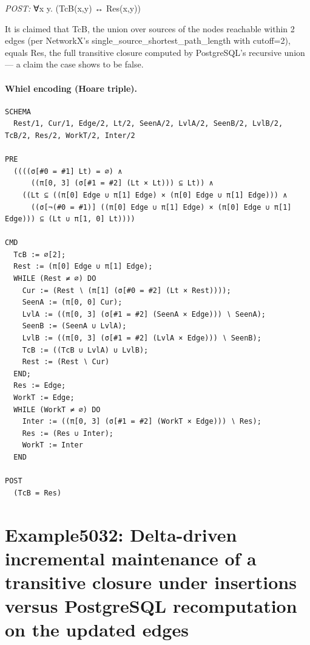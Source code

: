 \documentclass[10pt]{article}
\begin{document}
\textit{POST:} ∀x y. (TcB(x,y) ↔ Res(x,y))\par It is claimed that TcB, the union over sources of the nodes reachable within 2 edges (per NetworkX's single\_source\_shortest\_path\_length with cutoff=2), equals Res, the full transitive closure computed by PostgreSQL's recursive union --- a claim the case shows to be false.

\paragraph{Whiel encoding (Hoare triple).}

\begin{Verbatim}[fontsize=\scriptsize,breaklines=true,breakanywhere=true,frame=single,framesep=1.5mm]
SCHEMA
  Rest/1, Cur/1, Edge/2, Lt/2, SeenA/2, LvlA/2, SeenB/2, LvlB/2, TcB/2, Res/2, WorkT/2, Inter/2

PRE
  ((((σ[#0 = #1] Lt) = ∅) ∧
      ((π[0, 3] (σ[#1 = #2] (Lt × Lt))) ⊆ Lt)) ∧
    ((Lt ⊆ ((π[0] Edge ∪ π[1] Edge) × (π[0] Edge ∪ π[1] Edge))) ∧
      ((σ[¬(#0 = #1)] ((π[0] Edge ∪ π[1] Edge) × (π[0] Edge ∪ π[1] Edge))) ⊆ (Lt ∪ π[1, 0] Lt))))

CMD
  TcB := ∅[2];
  Rest := (π[0] Edge ∪ π[1] Edge);
  WHILE (Rest ≠ ∅) DO
    Cur := (Rest ∖ (π[1] (σ[#0 = #2] (Lt × Rest))));
    SeenA := (π[0, 0] Cur);
    LvlA := ((π[0, 3] (σ[#1 = #2] (SeenA × Edge))) ∖ SeenA);
    SeenB := (SeenA ∪ LvlA);
    LvlB := ((π[0, 3] (σ[#1 = #2] (LvlA × Edge))) ∖ SeenB);
    TcB := ((TcB ∪ LvlA) ∪ LvlB);
    Rest := (Rest ∖ Cur)
  END;
  Res := Edge;
  WorkT := Edge;
  WHILE (WorkT ≠ ∅) DO
    Inter := ((π[0, 3] (σ[#1 = #2] (WorkT × Edge))) ∖ Res);
    Res := (Res ∪ Inter);
    WorkT := Inter
  END

POST
  (TcB = Res)
\end{Verbatim}

\Needspace{0.45\textheight}

\section{Example5032: Delta-driven incremental maintenance of a transitive closure under insertions versus PostgreSQL recomputation on the updated edges}\label{case:Example5032}
\end{document}
